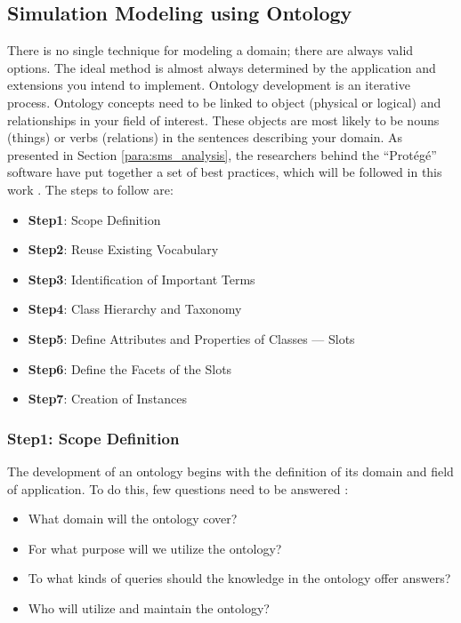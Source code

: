 \subsection{Simulation Modeling using Ontology}
There is no single technique for modeling a domain; there are always valid options. The ideal method is almost always determined by the application and extensions you intend to implement. Ontology development is an iterative process. Ontology concepts need to be linked to object (physical or logical) and relationships in your field of interest. These objects are most likely to be nouns (things) or verbs (relations) in the sentences describing your domain. As presented in Section \ref{para:sms_analysis}, the researchers behind the “Protégé” software have put together a set of best practices, which will be followed in this work \cite{noy2001ontology}. The steps to follow are:

\begin{itemize}
    \item \textbf{Step1}: Scope Definition
    \item \textbf{Step2}: Reuse Existing Vocabulary
    \item \textbf{Step3}: Identification of Important Terms
    \item \textbf{Step4}: Class Hierarchy and Taxonomy
    \item \textbf{Step5}: Define Attributes and Properties of Classes — Slots
    \item \textbf{Step6}: Define the Facets of the Slots
    \item \textbf{Step7}: Creation of Instances
\end{itemize}

    \subsubsection{Step1: Scope Definition}
    The development of an ontology begins with the definition of its domain and field of application. To do this, few questions need to be answered \cite{noy2001ontology}:
    
    \begin{itemize}
        \item What domain will the ontology cover? 
        \item For what purpose will we utilize the ontology? 
        \item To what kinds of queries should the knowledge in the ontology offer answers? 
        \item Who will utilize and maintain the ontology?
    \end{itemize}
    
